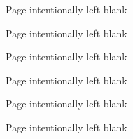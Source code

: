 \documentclass[12pts,twoside,a4paper]{report}
\title{\thesistitle}
\author{\authorname}
\date{\today}
\begin{document}
 
	
\clearpage
		Page intentionally left blank
 	
 
\clearpage
		Page intentionally left blank
	
\clearpage
		Page intentionally left blank
	\afterpage{\clearpage}
 	
 		
	\clearpage
		Page intentionally left blank

 		
 	\clearpage
 		Page intentionally left blank


	\tableofcontents
	\listoffigures
	\listoftables

	
	\clearpage
		Page intentionally left blank
	\clearpage
	
 	
    
    
    
 	
 	
 	
 	
	\singlespacing
	
	
\end{document}
